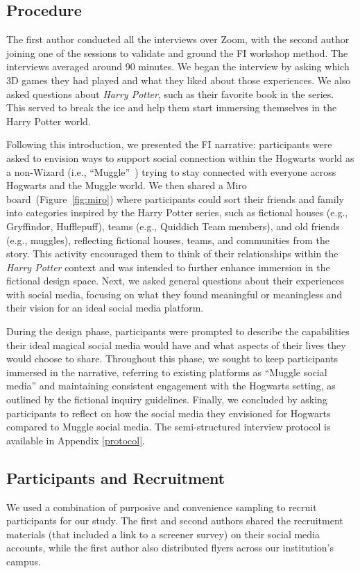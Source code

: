 \subsection{Procedure}
The first author conducted all the interviews over Zoom, with the second author joining one of the sessions to validate and ground the FI workshop method. The interviews averaged around 90 minutes. We began the interview by asking which 3D games they had played and what they liked about those experiences. We also asked questions about \textit{Harry Potter}, such as their favorite book in the series. This served to break the ice and help them start immersing themselves in the Harry Potter world.

Following this introduction, we presented the FI narrative: participants were asked to envision ways to support social connection within the Hogwarts world as a non-Wizard (i.e., ``Muggle''~\cite{muggle}) trying to stay connected with everyone across Hogwarts and the Muggle world. We then shared a Miro~\cite{miro} board~(Figure~\ref{fig:miro}) where participants could sort their friends and family into categories inspired by the Harry Potter series, such as fictional houses (e.g., Gryffindor, Hufflepuff), teams (e.g., Quiddich Team members), and old friends (e.g., muggles), reflecting fictional houses, teams, and communities from the story. This activity encouraged them to think of their relationships within the \textit{Harry Potter} context and was intended to further enhance immersion in the fictional design space. Next, we asked general questions about their experiences with social media, focusing on what they found meaningful or meaningless and their vision for an ideal social media platform. 

During the design phase, participants were prompted to describe the capabilities their ideal magical social media would have and what aspects of their lives they would choose to share. Throughout this phase, we sought to keep participants immersed in the narrative, referring to existing platforms as ``Muggle social media'' and maintaining consistent engagement with the Hogwarts setting, as outlined by the fictional inquiry guidelines. Finally, we concluded by asking participants to reflect on how the social media they envisioned for Hogwarts compared to Muggle social media. The semi-structured interview protocol is available in Appendix \ref{protocol}.

\subsection{Participants and Recruitment}
We used a combination of purposive and convenience sampling to recruit participants for our study. The first and second authors shared the recruitment materials (that included a link to a screener survey) on their social media accounts, while the first author also distributed flyers across our institution's campus.

